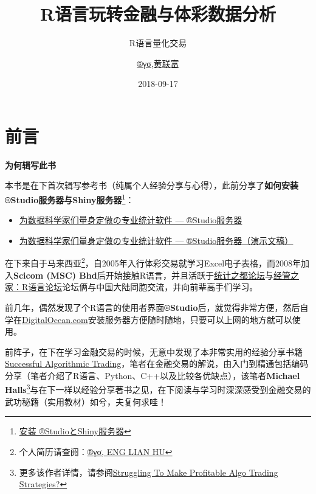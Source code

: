 \documentclass[]{book}
\title{R语言玩转金融与体彩数据分析}
\subtitle{R语言量化交易}
\author{\href{https://beta.rstudioconnect.com/content/3091/ryo-eng.html}{®γσ,黄联富}}
\date{2018-09-17}
\providecommand{\tightlist}{%
  \setlength{\itemsep}{0pt}\setlength{\parskip}{0pt}}
\let\rmarkdownfootnote\footnote%
\def\footnote{\protect\rmarkdownfootnote}
\theoremstyle{definition}
\theoremstyle{definition}
\theoremstyle{definition}
\theoremstyle{remark}
\begin{document}
\maketitle

{
\setcounter{tocdepth}{1}
\tableofcontents
}
\hypertarget{preface}{%
\chapter{前言}\label{preface}}

\textbf{为何辑写此书}

本书是在下首次辑写参考书（纯属个人经验分享与心得），此前分享了\textbf{如何安装®Studio服务器与Shiny服务器}\footnote{\href{https://github.com/scibrokes/setup-rstudio-server}{安装
  ®StudioとShiny服务器}}：

\begin{itemize}
\tightlist
\item
  \href{https://beta.rstudioconnect.com/englianhu/Introducing-RStudio-Server-for-Data-Scientists/Introducing-RStudio-Server-for-Data-Scientists.html}{为数据科学家们量身定做の专业统计软件
  --- ®Studio服务器}
\item
  \href{https://beta.rstudioconnect.com/englianhu/Introducing-RStudio-Server-for-Data-Scientists-Slides/Introducing-RStudio-Server-for-Data-Scientists-slides.html}{为数据科学家们量身定做の专业统计软件
  --- ®Studio服务器（演示文稿）}
\end{itemize}

在下来自于马来西亚\footnote{个人简历请查阅：\href{https://beta.rstudioconnect.com/content/3091/ryo-eng.html}{®γσ,
  ENG LIAN HU}}，自2005年入行体彩交易就学习Excel电子表格，而2008年加入\textbf{Scicom
(MSC)
Bhd}后开始接触R语言，并且活跃于\href{https://d.cosx.org}{统计之都论坛}与\href{http://bbs.pinggu.org/forum-69-1.html}{经管之家：R语言论坛}论坛俩与中国大陆同胞交流，并向前辈高手们学习。

前几年，偶然发现了个R语言的使用者界面\textbf{®Studio}后，就觉得非常方便，然后自学在\href{https://m.do.co/c/aabb124120d0}{DigitalOcean.com}安装服务器方便随时随地，只要可以上网的地方就可以使用。

前阵子，在下在学习金融交易的时候，无意中发现了本非常实用的经验分享书籍\href{https://raw.githubusercontent.com/englianhu/binary.com-interview-question/master/reference/Successful\%20Algorithmic\%20Trading.pdf}{Successful
Algorithmic
Trading}，笔者在金融交易的解说，由入门到精通包括编码分享（笔者介绍了R语言、Python、C++以及比较各优缺点），该笔者\textbf{Michael
Halls}\footnote{更多该作者详情，请参阅\href{https://www.quantstart.com/successful-algorithmic-trading-ebook}{Struggling
  To Make Profitable Algo Trading Strategies?}}与在下一样以经验分享著书之见，在下阅读与学习时深深感受到金融交易的武功秘籍（实用教材）如兮，夫复何求哇！
\end{document}
